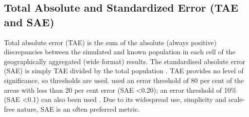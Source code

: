 \documentclass[a4paper,10pt]{article}
\begin{document}


\subsection{Total Absolute and Standardized Error (TAE and SAE)}
Total absolute error (TAE) is the sum of the absolute (always positive)
discrepancies between the simulated
and known population in each cell of the geographically aggregated (wide format)
results. The standardised absolute error (SAE) is
simply TAE divided by the total population \citep{Voas2001}.
TAE provides no level of significance, so thresholds are used.
\citet{clarke2001regional} used an error threshold of 80 per cent of the
areas with less than 20 per cent error (SAE \textless 0.20);
an error threshold of 10\%  (SAE \textless 0.1) can also been used %
\citet{smith2007simhealth}. %
Due to its widespread use, simplicity and scale-free nature,
SAE is an often preferred metric.
\end{document}
